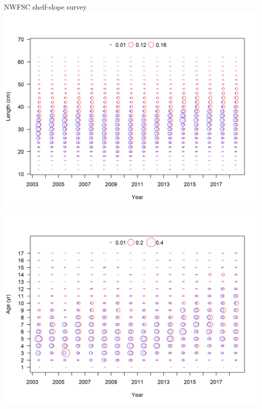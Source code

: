 \documentclass[pdf]{beamer}\usepackage[]{graphicx}\usepackage[]{color}
\begin{document}
\begin{frame}{NWFSC shelf-slope survey }
  \includegraphics[scale = 0.37]{r4ss/comp_lendat_bubflt7mkt0.png}
  \includegraphics[scale = 0.37]{r4ss/comp_gstagedat_bubflt7mkt0.png}
\end{frame}
\end{document}
